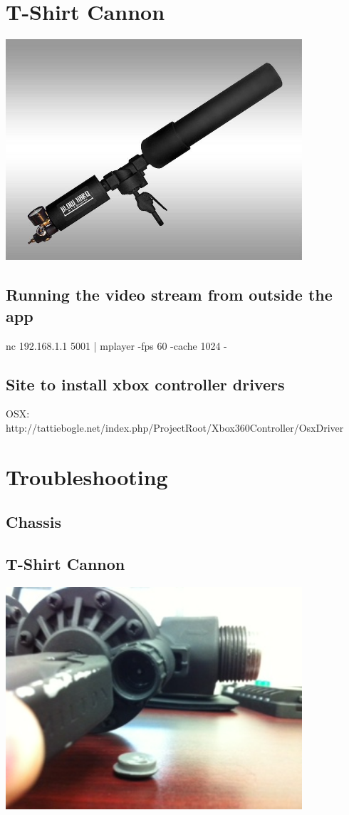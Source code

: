 \documentclass[letterpaper,12pt]{article}
\begin{document}
\section{T-Shirt Cannon}
\begin{center}
    \includegraphics[width=11cm]{pics/cannon/blowhard_cannon.jpg}
\end{center}


\subsection{Running the video stream from outside the app}
nc 192.168.1.1 5001 | mplayer -fps 60 -cache 1024 -

\subsection{Site to install xbox controller drivers}
OSX: http://tattiebogle.net/index.php/ProjectRoot/Xbox360Controller/OsxDriver

\section{Troubleshooting}
\subsection{Chassis}
\subsection{T-Shirt Cannon}

\begin{center}
    \includegraphics[width=11cm]{pics/cannon/broken_release_valve.jpg}
\end{center}
\end{document}
